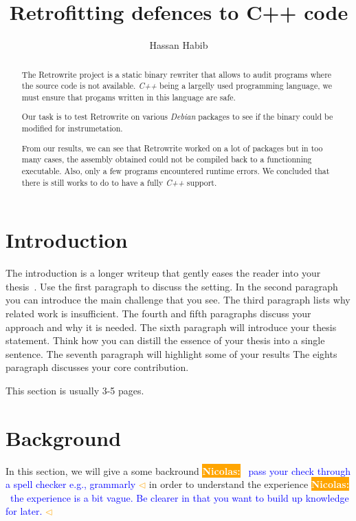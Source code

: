 \documentclass[a4paper,11pt,oneside]{report}
\title{Retrofitting defences to C++ code}
\author{Hassan Habib}
\newcommand{\sysname}{Retrowrite\xspace}
\newcommand{\todobox}[3]{%
    \colorbox{#1}{\textcolor{white}{\sffamily\bfseries\scriptsize #2}}%
    ~\textcolor{blue}{#3} %
    \textcolor{#1}{$\triangleleft$}%
}
\newcommand{\nb}[1]{\todobox{orange}{Nicolas:}{#1}}
\begin{document}
\maketitle

\begin{abstract}
The \sysname project is a static binary rewriter that allows to audit programs where the
source code is not available.
\textit{C++} being a largelly used programming language, we must ensure that
progams written in this language are safe. 

Our task is to test \sysname on various \textit{Debian} packages to see if the
binary could be modified for instrumetation.

From our results, we can see that \sysname worked on a lot of packages but in
too many cases, the assembly obtained could not be compiled back to a
functionning executable. Also, only a few programs encountered runtime errors.
We concluded that there is still works to do to have a fully \textit{C++} support.

\end{abstract}


\maketoc

\chapter{Introduction}

The introduction is a longer writeup that gently eases the reader into your
thesis~\cite{dinesh20oakland}. Use the first paragraph to discuss the setting.
In the second paragraph you can introduce the main challenge that you see.
The third paragraph lists why related work is insufficient.
The fourth and fifth paragraphs discuss your approach and why it is needed.
The sixth paragraph will introduce your thesis statement. Think how you can
distill the essence of your thesis into a single sentence.
The seventh paragraph will highlight some of your results
The eights paragraph discusses your core contribution.

This section is usually 3-5 pages.

\chapter{Background}
In this section, we will give a some backround \nb{pass your check
through a spell checker e.g., grammarly} in order to understand
the experience \nb{the experience is a bit vague. Be clearer in that you want to
build up knowledge for later.}
\end{document}

